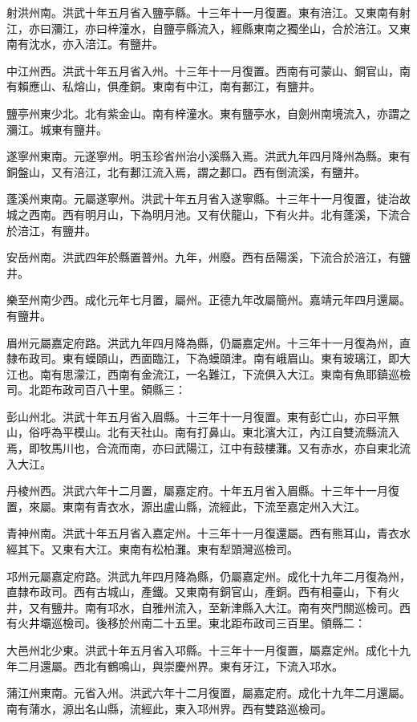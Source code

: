 射洪州南。洪武十年五月省入鹽亭縣。十三年十一月復置。東有涪江。又東南有射江，亦曰瀰江，亦曰梓潼水，自鹽亭縣流入，經縣東南之獨坐山，合於涪江。又東南有沈水，亦入涪江。有鹽井。

中江州西。洪武十年五月省入州。十三年十一月復置。西南有可蒙山、銅官山，南有賴應山、私熔山，俱產銅。東南有中江，南有郪江，有鹽井。

鹽亭州東少北。北有紫金山。南有梓潼水。東有鹽亭水，自劍州南境流入，亦謂之瀰江。城東有鹽井。

遂寧州東南。元遂寧州。明玉珍省州治小溪縣入焉。洪武九年四月降州為縣。東有銅盤山，又有涪江，北有郪江流入焉，謂之郪口。西有倒流溪，有鹽井。

蓬溪州東南。元屬遂寧州。洪武十年五月省入遂寧縣。十三年十一月復置，徙治故城之西南。西有明月山，下為明月池。又有伏龍山，下有火井。北有蓬溪，下流合於涪江，有鹽井。

安岳州南。洪武四年於縣置普州。九年，州廢。西有岳陽溪，下流合於涪江，有鹽井。

樂至州南少西。成化元年七月置，屬州。正德九年改屬簡州。嘉靖元年四月還屬。有鹽井。

眉州元屬嘉定府路。洪武九年四月降為縣，仍屬嘉定州。十三年十一月復為州，直隸布政司。東有蟆頤山，西面臨江，下為蟆頤津。南有峨眉山。東有玻璃江，即大江也。南有思濛江，西南有金流江，一名難江，下流俱入大江。東南有魚耶鎮巡檢司。北距布政司百八十里。領縣三：

彭山州北。洪武十年五月省入眉縣。十三年十一月復置。東有彭亡山，亦曰平無山，俗呼為平模山。北有天社山。南有打鼻山。東北濱大江，內江自雙流縣流入焉，即牧馬川也，合流而南，亦曰武陽江，江中有鼓樓灘。又有赤水，亦自東北流入大江。

丹棱州西。洪武六年十二月置，屬嘉定府。十年五月省入眉縣。十三年十一月復置，來屬。東南有青衣水，源出盧山縣，流經此，下流至嘉定州入大江。

青神州南。洪武十年五月省入嘉定州。十三年十一月復還屬。西有熊耳山，青衣水經其下。又東有大江。東南有松柏灘。東有犁頭灣巡檢司。

邛州元屬嘉定府路。洪武九年四月降為縣，仍屬嘉定州。成化十九年二月復為州，直隸布政司。西有古城山，產鐵。又東南有銅官山，產銅。西有相臺山，下有火井，又有鹽井。南有邛水，自雅州流入，至新津縣入大江。南有夾門關巡檢司。西有火井壩巡檢司。後移於州南二十五里。東北距布政司三百里。領縣二：

大邑州北少東。洪武十年五月省入邛縣。十三年十一月復置，屬嘉定州。成化十九年二月還屬。西北有鶴鳴山，與崇慶州界。東有牙江，下流入邛水。

蒲江州東南。元省入州。洪武六年十二月復置，屬嘉定府。成化十九年二月還屬。南有蒲水，源出名山縣，流經此，東入邛州界。西有雙路巡檢司。

